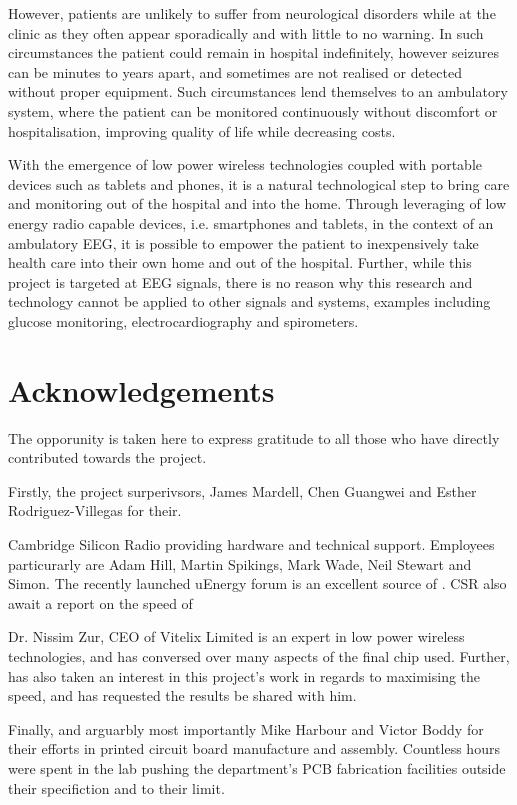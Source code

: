 \documentclass[]{article}
\begin{document}
However, patients are unlikely to suffer from neurological disorders while at the clinic as they often appear sporadically and with little to no warning. In such circumstances the patient could remain in hospital indefinitely, however seizures can be minutes to years apart, and sometimes are not realised or detected without proper equipment. Such circumstances lend themselves to an ambulatory system, where the patient can be monitored continuously without discomfort or hospitalisation, improving quality of life while decreasing costs. 

With the emergence of low power wireless technologies coupled with portable devices such as tablets and phones, it is a natural technological step to bring care and monitoring out of the hospital and into the home. Through leveraging of low energy radio capable devices, i.e. smartphones and tablets, in the context of an ambulatory EEG, it is possible to empower the patient to inexpensively take health care into their own home and out of the hospital. Further, while this project is targeted at EEG signals, there is no reason why this research and technology cannot be applied to other signals and systems, examples including glucose monitoring, electrocardiography and spirometers.

\cite{Blanco95}
\clearpage
\tableofcontents
\clearpage

\section{Acknowledgements}
The opporunity is taken here to express gratitude to all those who have directly contributed towards the project. 

Firstly, the project surperivsors, James Mardell, Chen Guangwei and Esther Rodriguez-Villegas for their. 

Cambridge Silicon Radio providing hardware and technical support. Employees particurarly are Adam Hill, Martin Spikings, Mark Wade, Neil Stewart and Simon. The recently launched uEnergy forum is an excellent source of . CSR also await a report on the speed of 

Dr. Nissim Zur, CEO of Vitelix Limited is an expert in low power wireless technologies, and has conversed over many aspects of the final chip used. Further, has also taken an interest in this project's work in regards to maximising the speed, and has requested the results be shared with him.

Finally, and arguarbly most importantly Mike Harbour and Victor Boddy for their efforts in printed circuit board manufacture and assembly. Countless hours were spent in the lab pushing the department's PCB fabrication facilities outside their specifiction and to their limit. 
\end{document}
